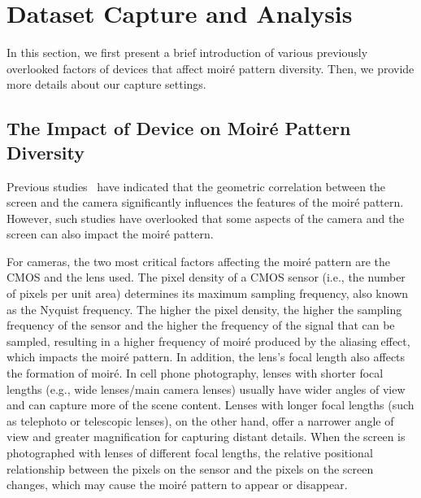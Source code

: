 \section{Dataset Capture and Analysis}
\label{sec:sup_dataset}



In this section, we first present a brief introduction of various previously overlooked factors of devices that affect moiré pattern diversity. Then, we provide more details about our capture settings.

\subsection{The Impact of Device on Moiré Pattern Diversity}


Previous studies~\cite{yu2022towards, yang2023doing} have indicated that the geometric correlation between the screen and the camera significantly influences the features of the moiré pattern. However, such studies have overlooked that some aspects of the camera and the screen can also impact the moiré pattern.

For cameras, the two most critical factors affecting the moiré pattern are the CMOS and the lens used. The pixel density of a CMOS sensor (i.e., the number of pixels per unit area) determines its maximum sampling frequency, also known as the Nyquist frequency. The higher the pixel density, the higher the sampling frequency of the sensor and the higher the frequency of the signal that can be sampled, resulting in a higher frequency of moiré produced by the aliasing effect, which impacts the moiré pattern. In addition, the lens's focal length also affects the formation of moiré. In cell phone photography, lenses with shorter focal lengths (e.g., wide lenses/main camera lenses) usually have wider angles of view and can capture more of the scene content. Lenses with longer focal lengths (such as telephoto or telescopic lenses), on the other hand, offer a narrower angle of view and greater magnification for capturing distant details. When the screen is photographed with lenses of different focal lengths, the relative positional relationship between the pixels on the sensor and the pixels on the screen changes, which may cause the moiré pattern to appear or disappear.


